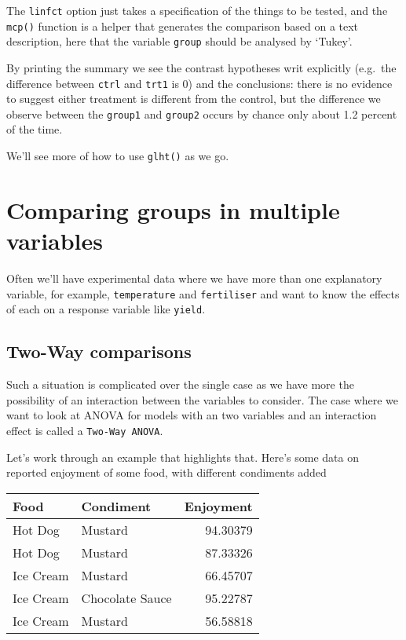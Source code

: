 \documentclass[]{book}
\begin{document}
The \texttt{linfct} option just takes a specification of the things to be tested, and the \texttt{mcp()} function is a helper that generates the comparison based on a text description, here that the variable \texttt{group} should be analysed by `Tukey'.

By printing the summary we see the contrast hypotheses writ explicitly (e.g.~the difference between \texttt{ctrl} and \texttt{trt1} is 0) and the conclusions: there is no evidence to suggest either treatment is different from the control, but the difference we observe between the \texttt{group1} and \texttt{group2} occurs by chance only about 1.2 percent of the time.

We'll see more of how to use \texttt{glht()} as we go.

\hypertarget{comparing-groups-in-multiple-variables}{%
\section{Comparing groups in multiple variables}\label{comparing-groups-in-multiple-variables}}

Often we'll have experimental data where we have more than one explanatory variable, for example, \texttt{temperature} and \texttt{fertiliser} and want to know the effects of each on a response variable like \texttt{yield}.

\hypertarget{two-way-comparisons}{%
\subsection{Two-Way comparisons}\label{two-way-comparisons}}

Such a situation is complicated over the single case as we have more the possibility of an interaction between the variables to consider. The case where we want to look at ANOVA for models with an two variables and an interaction effect is called a \texttt{Two-Way\ ANOVA}.

Let's work through an example that highlights that. Here's some data on reported enjoyment of some food, with different condiments added

\begin{tabular}{l|l|r}
\hline
Food & Condiment & Enjoyment\\
\hline
Hot Dog & Mustard & 94.30379\\
\hline
Hot Dog & Mustard & 87.33326\\
\hline
Ice Cream & Mustard & 66.45707\\
\hline
Ice Cream & Chocolate Sauce & 95.22787\\
\hline
Ice Cream & Mustard & 56.58818\\
\hline
\end{tabular}
\end{document}
